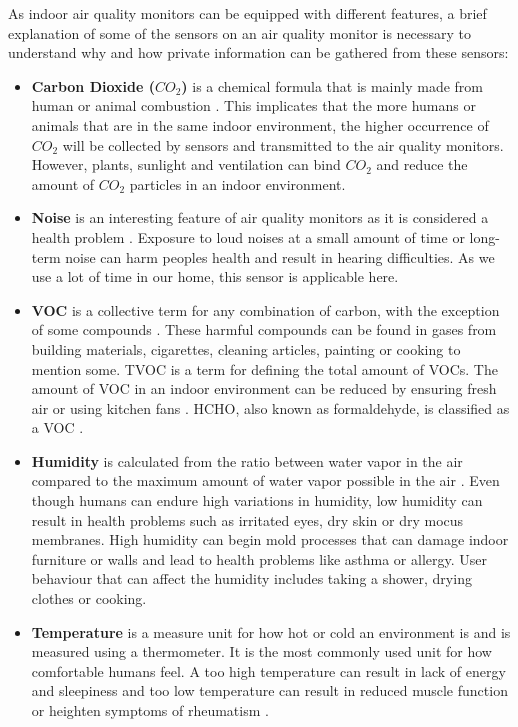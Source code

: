 As indoor air quality monitors can be equipped with different features, a brief explanation of some of the sensors on an air quality monitor is necessary to understand why and how private information can be gathered from these sensors:
\begin{itemize}
    \item \textbf{Carbon Dioxide (\(CO_2\))} is a chemical formula that is mainly made from human or animal combustion \cite{CO2}. This implicates that the more humans or animals that are in the same indoor environment, the higher occurrence of \(CO_2\) will be collected by sensors and transmitted to the air quality monitors. However, plants, sunlight and ventilation can bind \(CO_2\) and reduce the amount of \(CO_2\) particles in an indoor environment.
    \item \textbf{Noise} is an interesting feature of air quality monitors as it is considered a health problem \cite{Noise}. Exposure to loud noises at a small amount of time or long-term noise can harm peoples health and result in hearing difficulties. As we use a lot of time in our home, this sensor is applicable here. 
    \item \textbf{\gls{VOC}} is a collective term for any combination of carbon, with the exception of some compounds \cite{VOC}. These harmful compounds can be found in gases from building materials, cigarettes, cleaning articles, painting or cooking to mention some. \gls{TVOC} is a term for defining the total amount of \gls{VOC}s. The amount of \gls{VOC} in an indoor environment can be reduced by ensuring fresh air or using kitchen fans \cite{RecommendedIAQ}. HCHO, also known as formaldehyde, is classified as a \gls{VOC} \cite{HCHO}.
    \item \textbf{Humidity} is calculated from the ratio between water vapor in the air compared to the maximum amount of water vapor possible in the air \cite{RecommendedIAQ}. Even though humans can endure high variations in humidity, low humidity can result in health problems such as irritated eyes, dry skin or dry mocus membranes. High humidity can begin mold processes that can damage indoor furniture or walls and lead to health problems like asthma or allergy. User behaviour that can affect the humidity includes taking a shower, drying clothes or cooking. 
    \item \textbf{Temperature} is a measure unit for how hot or cold an environment is and is measured using a thermometer. It is the most commonly used unit for how comfortable humans feel. A too high temperature can result in lack of energy and sleepiness and too low temperature can result in reduced muscle function or heighten symptoms of rheumatism \cite{Temp}.
\end{itemize}

